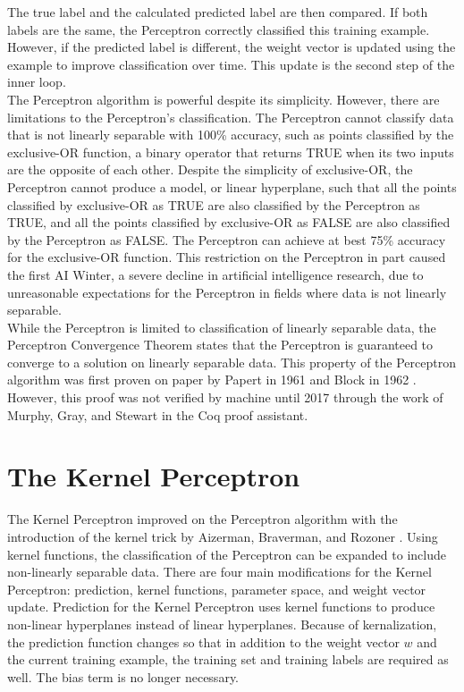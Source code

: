 The true label and the calculated predicted label are then compared. If both labels are the same, the Perceptron correctly classified this training example. However, if the predicted label is different, the weight vector is updated using the example to improve classification over time. This update is the second step of the inner loop.
\\The Perceptron algorithm is powerful despite its simplicity. However, there are limitations to the Perceptron's classification. The Perceptron cannot classify data that is not linearly separable with 100\% accuracy, such as points classified by the exclusive-OR function, a binary operator that returns TRUE when its two inputs are the opposite of each other. Despite the simplicity of exclusive-OR, the Perceptron cannot produce a model, or linear hyperplane, such that all the points classified by exclusive-OR as TRUE are also classified by the Perceptron as TRUE, and all the points classified by exclusive-OR as FALSE are also classified by the Perceptron as FALSE. The Perceptron can achieve at best 75\% accuracy for the exclusive-OR function. This restriction on the Perceptron in part caused the first AI Winter, a severe decline in artificial intelligence research, due to unreasonable expectations for the Perceptron in fields where data is not linearly separable.
\\While the Perceptron is limited to classification of linearly separable data, the Perceptron Convergence Theorem states that the Perceptron is guaranteed to converge to a solution on linearly separable data. This property of the Perceptron algorithm was first proven on paper by Papert in 1961 \cite{Pap61} and Block in 1962 \cite{Blo62}. However, this proof was not verified by machine until 2017 through the work of Murphy, Gray, and Stewart \cite{MGS17} in the Coq proof assistant. 
\section{The Kernel Perceptron}\label{KernelPerceptronSection}
The Kernel Perceptron improved on the Perceptron algorithm with the introduction of the kernel trick by Aizerman, Braverman, and Rozoner \cite{ABR64}. Using kernel functions, the classification of the Perceptron can be expanded to include non-linearly separable data. There are four main modifications for the Kernel Perceptron: prediction, kernel functions, parameter space, and weight vector update. Prediction for the Kernel Perceptron uses kernel functions to produce non-linear hyperplanes instead of linear hyperplanes. Because of kernalization, the prediction function changes so that in addition to the weight vector $w$ and the current training example, the training set and training labels are required as well. The bias term is no longer necessary.

